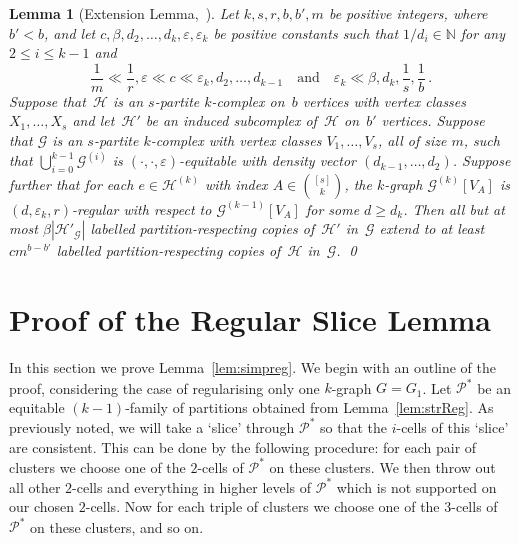 \documentclass[12pt,a4paper]{amsart}
\let\eps\varepsilon
\newtheorem{lemma}[theorem] {Lemma}
\newcommand{\NATS}{\mathbb{N}}
\newcommand{\Hy}{\mathcal{H}}
\newcommand{\cG}{\mathcal{G}}
\newcommand{\Part}{\mathcal{P}}
\begin{document}
\begin{lemma}[Extension Lemma,~{\cite[Lemma 4.6]{lcycles}}]\label{lem:ext}
Let $k,s,r,b,b',m$ be positive integers, where $b'<b$, and let $c,
\beta,d_2,\ldots,d_k,\eps,\eps_k$ be positive constants such that $1/d_i
\in\NATS$ for any $2 \leq i \leq k-1$ and 
\[\frac{1}{m}\ll \frac{1}{r},
\eps \ll c \ll \eps_k,d_2,\ldots,d_{k-1}\quad\text{and}\quad \eps_k \ll
\beta,d_k,\frac{1}{s},\frac{1}{b}\,.\]
Suppose that~$\Hy$ is an $s$-partite $k$-complex on~$b$ vertices
with vertex classes $X_1, \dots, X_s$ and let~$\Hy'$ be an induced subcomplex
of~$\Hy$ on~$b'$ vertices.
Suppose that $\cG$ is an $s$-partite $k$-complex with vertex classes $V_1,\ldots,V_s$, all of size $m$, such that $\bigcup_{i=0}^{k-1}\cG^{(i)}$ is $(\cdot, \cdot, \eps)$-equitable with density vector
$(d_{k-1},\ldots,d_2)$.  Suppose further that for each $e\in\Hy^{(k)}$ with index $A \in \binom{[s]}{k}$, the $k$-graph $\cG^{(k)}[V_A]$ is $(d,\eps_k,r)$-regular with respect to $\cG^{(k-1)}[V_A]$ for some $d\ge d_k$. Then
all but at most $\beta |\Hy'_\cG|$ labelled partition-respecting copies of~$\Hy'$
in~$\cG$ extend to at least $cm^{b-b'}$ labelled partition-respecting
copies of~$\Hy$ in~$\cG$. \qed
\end{lemma}


\section{Proof of the Regular Slice Lemma}\label{sec:regslice}
In this section we prove Lemma~\ref{lem:simpreg}.
We begin with an outline of the proof, considering the case of regularising only one $k$-graph $G=G_1$. Let $\Part^*$ be an equitable $(k-1)$-family of partitions obtained from Lemma~\ref{lem:strReg}. 
As previously noted, we will take a `slice' through $\Part^*$ so that the $i$-cells of this `slice' are consistent.
This can be done by the following procedure: for each pair of clusters we choose one
of the $2$-cells of $\Part^*$ on these clusters. We then throw out all other
$2$-cells and everything in higher levels of $\Part^*$ which is not supported on
our chosen $2$-cells. Now for each triple of clusters we choose one of the
$3$-cells of $\Part^*$ on these clusters, and so on.
\end{document}
